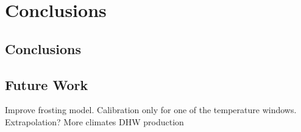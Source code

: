 \chapter{Conclusions}\label{ch:conclusions} 



\section{Conclusions}

\section{Future Work}
Improve frosting model.
Calibration only for one of the temperature windows. Extrapolation?
More climates
DHW production
